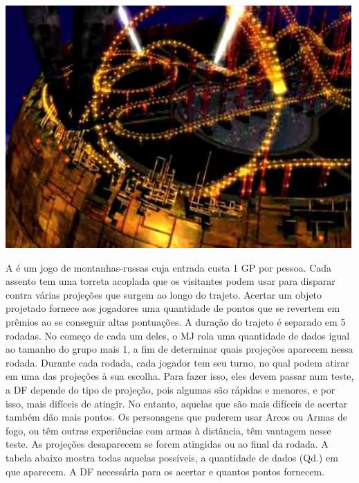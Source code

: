 %
%
%
%
%
%
%
\begin{center} \includegraphics[width=\columnwidth]{./art/goldsaucer/shootingcoaster.jpg} \end{center}
A  é um jogo de montanhas-russas cuja entrada custa 1 GP por pessoa. 
Cada assento tem uma torreta acoplada que os visitantes podem usar para disparar contra várias projeções que surgem ao longo do trajeto.
Acertar um objeto projetado fornece aos jogadores uma quantidade de pontos que se revertem em prêmios ao se conseguir altas pontuações.
A duração do trajeto é separado em 5 rodadas.
No começo de cada um deles, o MJ rola uma quantidade de dados igual ao tamanho do grupo mais 1, a fim de determinar quais projeções aparecem nessa rodada.
Durante cada rodada, cada jogador tem seu turno, no qual podem atirar em uma das projeções à sua escolha.
Para fazer isso, eles devem passar num teste, a DF depende do tipo de projeção, pois algumas são rápidas e menores, e por isso, mais difíceis de atingir.
No entanto, aquelas que são mais difíceis de acertar também dão mais pontos.
Os personagens que puderem usar Arcos ou Armas de fogo, ou têm outras experiências com armas à distância, têm vantagem nesse teste.
As projeções desaparecem se forem atingidas ou ao final da rodada.
A tabela abaixo mostra todas aquelas possíveis, a quantidade de dados (Qd.) em que aparecem. A DF necessária para os acertar e quantos pontos fornecem.
%
\\\\
